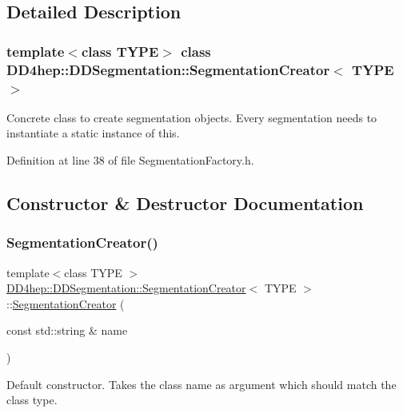 \subsection{Detailed Description}
\subsubsection*{template$<$class T\+Y\+PE$>$\newline
class D\+D4hep\+::\+D\+D\+Segmentation\+::\+Segmentation\+Creator$<$ T\+Y\+P\+E $>$}

Concrete class to create segmentation objects. Every segmentation needs to instantiate a static instance of this. 

Definition at line 38 of file Segmentation\+Factory.\+h.



\subsection{Constructor \& Destructor Documentation}
\hypertarget{class_d_d4hep_1_1_d_d_segmentation_1_1_segmentation_creator_aa260ef2741fe49696c70711f03c646cc}{}\label{class_d_d4hep_1_1_d_d_segmentation_1_1_segmentation_creator_aa260ef2741fe49696c70711f03c646cc} 
\subsubsection{\texorpdfstring{Segmentation\+Creator()}{SegmentationCreator()}}
{\footnotesize\ttfamily template$<$class T\+Y\+PE $>$ \\
\hyperlink{class_d_d4hep_1_1_d_d_segmentation_1_1_segmentation_creator}{D\+D4hep\+::\+D\+D\+Segmentation\+::\+Segmentation\+Creator}$<$ T\+Y\+PE $>$\+::\hyperlink{class_d_d4hep_1_1_d_d_segmentation_1_1_segmentation_creator}{Segmentation\+Creator} (\begin{DoxyParamCaption}\item[{const std\+::string \&}]{name }\end{DoxyParamCaption})\hspace{0.3cm}{\ttfamily [inline]}}



Default constructor. Takes the class name as argument which should match the class type. 



